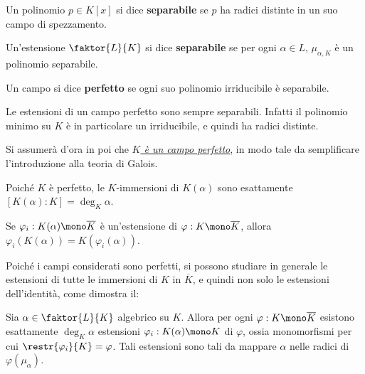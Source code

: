 \documentclass[12pt]{scrartcl}
\begin{document}
	\hr
	
	\begin{definition}
		Un polinomio $p \in K[x]$ si dice \textbf{separabile}
		se $p$ ha radici distinte in un suo campo di
		spezzamento.
	\end{definition}
	
	\begin{definition}
		Un'estensione $\faktor{L}{K}$ si dice \textbf{separabile}
		se per ogni $\alpha \in L$, $\mu_{\alpha,K}$ è
		un polinomio separabile.
	\end{definition}
	
	\begin{definition}
		Un campo si dice \textbf{perfetto} se ogni suo
		polinomio irriducibile è separabile.
	\end{definition}
	
	\begin{remark}
		Le estensioni di un campo perfetto sono sempre separabili.
		Infatti il polinomio minimo su $K$ è in particolare
		un irriducibile, e quindi ha radici distinte.
	\end{remark}
	
	\begin{note}
		Si assumerà d'ora in poi che \underline{\textit{$K$
		è un campo perfetto}}, in modo tale da semplificare l'introduzione
		alla teoria di Galois.
	\end{note}
	
	\begin{remark}
		Poiché $K$ è perfetto, le $K$-immersioni di $K(\alpha)$
		sono esattamente $[K(\alpha) : K] = \deg_K \alpha$.
	\end{remark}
	
	\begin{remark}
		Se $\varphi_i : K(\alpha) \mono \overline{K}$ è un'estensione di $\varphi : K \mono \overline{K}$, allora
		$\varphi_i(K(\alpha)) = K(\varphi_i(\alpha))$.
	\end{remark}

	Poiché i campi considerati sono perfetti, si possono
	studiare in generale le estensioni di tutte le immersioni
	di $K$ in $\overline{K}$, e quindi non solo le estensioni
	dell'identità, come dimostra il:
	
	\begin{theorem}
		Sia $\alpha \in \faktor{L}{K}$ algebrico su $K$. Allora
		per ogni $\varphi : K \mono \overline{K}$ esistono
		esattamente $\deg_K \alpha$ estensioni $\varphi_i : K(\alpha) \mono K$ di $\varphi$, ossia monomorfismi per cui $\restr{\varphi_i}{K} = \varphi$. Tali estensioni sono tali da mappare $\alpha$
		nelle radici di $\varphi(\mu_\alpha)$.
	\end{theorem}
	
\end{document}

